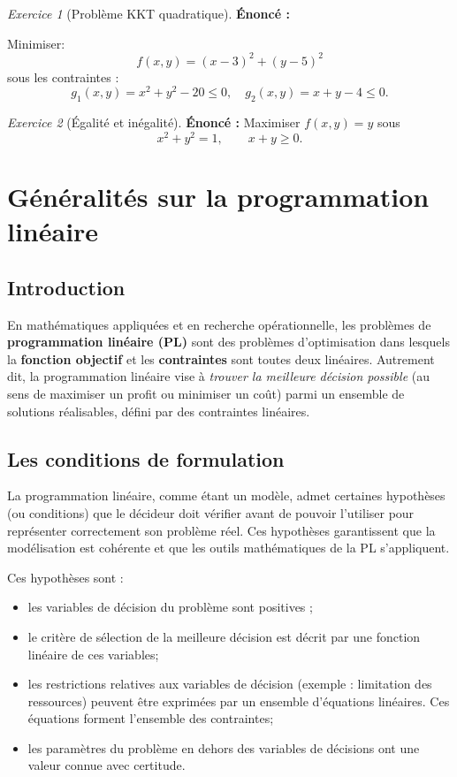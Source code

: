 \documentclass[a4paper,12pt,openany]{book}
\theoremstyle{plain}
\theoremstyle{definition}
\theoremstyle{remark}
\newtheorem{exercise}{Exercice}[section]
\theoremstyle{nbstyle}
\begin{document}
	\begin{exercise}[Problème KKT quadratique]
		\textbf{Énoncé :} 
		
		Minimiser:
		\[
		f(x, y) = (x - 3)^2 + (y - 5)^2
		\]
		sous les contraintes :
		\[
		g_1(x, y) = x^2 + y^2 - 20 \leq 0, \quad g_2(x, y) = x + y - 4 \leq 0.
		\]
	\end{exercise}
	
	\begin{exercise}[Égalité et inégalité]
		\textbf{Énoncé :} Maximiser $f(x,y)=y$ sous
		\[x^2+y^2=1,\qquad x+y\ge0.
		\]		
	\end{exercise}
	
	
	
	\chapter{Généralités sur la programmation linéaire}
	\label{chap:pl_generalites}
	
	\section{Introduction}
	
	En mathématiques appliquées et en recherche opérationnelle, les problèmes de \textbf{programmation linéaire (PL)} sont des problèmes d'optimisation dans lesquels la \textbf{fonction objectif} et les \textbf{contraintes} sont toutes deux linéaires.  
	Autrement dit, la programmation linéaire vise à \textit{trouver la meilleure décision possible} (au sens de maximiser un profit ou minimiser un coût) parmi un ensemble de solutions réalisables, défini par des contraintes linéaires.  
	\section{Les conditions de formulation}
	
	La programmation linéaire, comme étant un modèle, admet certaines hypothèses (ou conditions) que le décideur doit vérifier avant de pouvoir l'utiliser pour représenter correctement son problème réel. Ces hypothèses garantissent que la modélisation est cohérente et que les outils mathématiques de la PL s'appliquent.  
	
	Ces hypothèses sont :
	\begin{itemize}
		\item[$\diamond $] les variables de décision du problème sont positives ;
		\item[$\diamond $] le critère de sélection de la meilleure décision est décrit par une fonction linéaire de ces variables;
		\item[$\diamond $] les restrictions relatives aux variables de décision (exemple : limitation des ressources) peuvent être exprimées par un ensemble d'équations linéaires. Ces équations forment l'ensemble des contraintes;
		\item[$\diamond $]  les paramètres du problème en dehors des variables de décisions ont une valeur connue avec certitude.
	\end{itemize}
\end{document}
